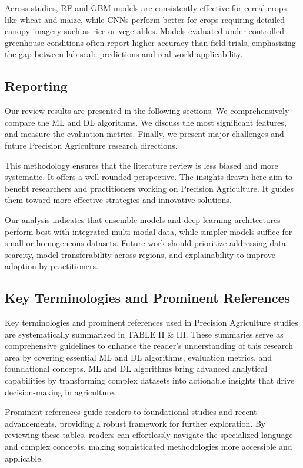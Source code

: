\documentclass[conference]{IEEEtran}
\begin{document}
Across studies, RF and GBM models are consistently effective for cereal crops like wheat and maize, while CNNs perform better for crops requiring detailed canopy imagery such as rice or vegetables. Models evaluated under controlled greenhouse conditions often report higher accuracy than field trials, emphasizing the gap between lab-scale predictions and real-world applicability.

\subsection{Reporting}
Our review results are presented in the following sections. We comprehensively compare the ML and DL algorithms. We discuss the most significant features, and measure the evaluation metrics. Finally, we present major challenges and future Precision Agriculture research directions. 

This methodology ensures that the literature review is less biased and more systematic. It offers a well-rounded perspective. The insights drawn here aim to benefit researchers and practitioners working on Precision Agriculture. It guides them toward more effective strategies and innovative solutions.

Our analysis indicates that ensemble models and deep learning architectures perform best with integrated multi-modal data, while simpler models suffice for small or homogeneous datasets. Future work should prioritize addressing data scarcity, model transferability across regions, and explainability to improve adoption by practitioners.

\subsection{Key Terminologies and Prominent References}

Key terminologies and prominent references used in Precision Agriculture studies are systematically summarized in TABLE II \& III. These summaries serve as comprehensive guidelines to enhance the reader's understanding of this research area by covering essential ML and DL algorithms, evaluation metrics, and foundational concepts. ML and DL algorithms bring advanced analytical capabilities by transforming complex datasets into actionable insights that drive decision-making in agriculture.

Prominent references guide readers to foundational studies and recent advancements, providing a robust framework for further exploration. By reviewing these tables, readers can effortlessly navigate the specialized language and complex concepts, making sophisticated methodologies more accessible and applicable.
\end{document}
